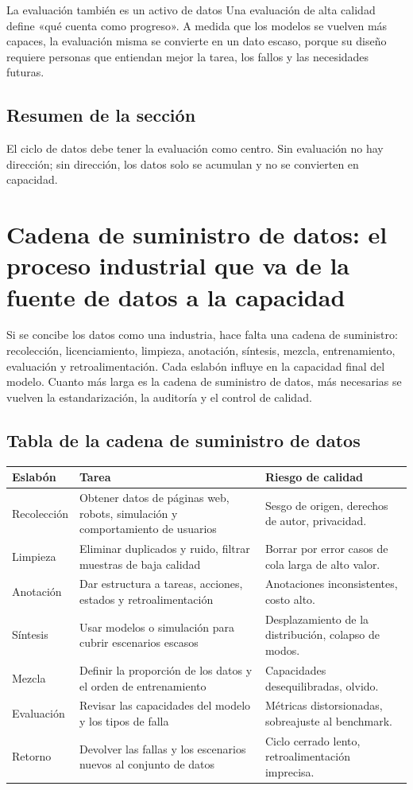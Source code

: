 \documentclass[a4paper]{article}
\begin{document}
\begin{importantbox}{La evaluación también es un activo de datos}
Una evaluación de alta calidad define «qué cuenta como progreso». A medida que los modelos se vuelven más capaces, la evaluación misma se convierte en un dato escaso, porque su diseño requiere personas que entiendan mejor la tarea, los fallos y las necesidades futuras.
\end{importantbox}

\subsection{Resumen de la sección}

El ciclo de datos debe tener la evaluación como centro. Sin evaluación no hay dirección; sin dirección, los datos solo se acumulan y no se convierten en capacidad.
\section{Cadena de suministro de datos: el proceso industrial que va de la fuente de datos a la capacidad}

Si se concibe los datos como una industria, hace falta una cadena de suministro: recolección, licenciamiento, limpieza, anotación, síntesis, mezcla, entrenamiento, evaluación y retroalimentación. Cada eslabón influye en la capacidad final del modelo. Cuanto más larga es la cadena de suministro de datos, más necesarias se vuelven la estandarización, la auditoría y el control de calidad.

\subsection{Tabla de la cadena de suministro de datos}

\noindent\begin{longtable}{p{}p{}p{}}
\toprule
Eslabón & Tarea & Riesgo de calidad \\
\midrule
Recolección & Obtener datos de páginas web, robots, simulación y comportamiento de usuarios & Sesgo de origen, derechos de autor, privacidad. \\
Limpieza & Eliminar duplicados y ruido, filtrar muestras de baja calidad & Borrar por error casos de cola larga de alto valor. \\
Anotación & Dar estructura a tareas, acciones, estados y retroalimentación & Anotaciones inconsistentes, costo alto. \\
Síntesis & Usar modelos o simulación para cubrir escenarios escasos & Desplazamiento de la distribución, colapso de modos. \\
Mezcla & Definir la proporción de los datos y el orden de entrenamiento & Capacidades desequilibradas, olvido. \\
Evaluación & Revisar las capacidades del modelo y los tipos de falla & Métricas distorsionadas, sobreajuste al benchmark. \\
Retorno & Devolver las fallas y los escenarios nuevos al conjunto de datos & Ciclo cerrado lento, retroalimentación imprecisa. \\
\bottomrule
\end{longtable}
\end{document}
